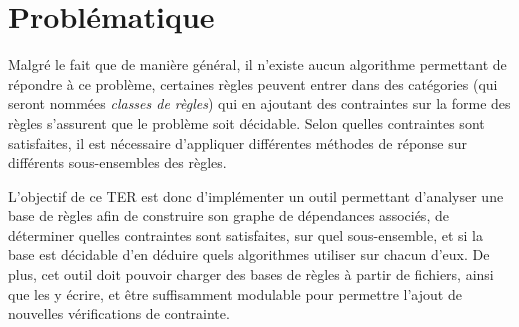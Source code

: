 
\section{Problématique}
Malgré le fait que de manière général, il n'existe aucun algorithme permettant de
répondre à ce problème, certaines règles peuvent entrer dans des catégories (qui seront
nommées {\em classes de règles}) qui en ajoutant des contraintes sur la forme des règles
s'assurent que le problème soit décidable.
Selon quelles contraintes sont satisfaites, il est nécessaire d'appliquer différentes
méthodes de réponse sur différents sous-ensembles des règles.

L'objectif de ce TER est donc d'implémenter un outil permettant d'analyser une base de règles 
afin de construire son graphe
de dépendances associés, de déterminer quelles contraintes sont satisfaites, sur quel
sous-ensemble, et si la base est décidable d'en déduire quels algorithmes utiliser 
sur chacun d'eux. 
De plus, cet outil doit pouvoir charger des bases de règles à partir de fichiers, 
ainsi que les y écrire, 
et être suffisamment modulable pour permettre l'ajout de nouvelles vérifications
de contrainte.

